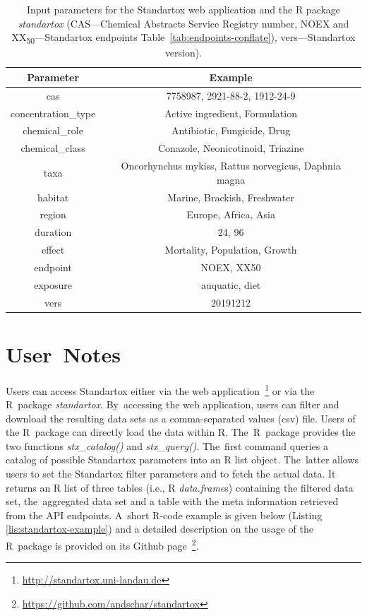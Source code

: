\documentclass[data,datadescriptor,accept,moreauthors,pdftex]{Definitions/mdpi}
\begin{document}
\begin{table}[H]
    \caption{Input parameters for the Standartox web application and the R package \textit{standartox} (CAS---Chemical Abstracts Service Registry number, NOEX and XX\textsubscript{50}---Standartox endpoints Table~\ref{tab:endpoints-conflate}), vers---Standartox version).}
    \label{tab:app-parameters}
    \centering
    \begin{tabular}{cc}
    \toprule
    \textbf{Parameter} & \textbf{Example} \\ 
    \midrule
    cas & 7758987, 2921-88-2, 1912-24-9 \\
    concentration\_type & Active ingredient, Formulation \\
    chemical\_role & Antibiotic, Fungicide, Drug \\
    chemical\_class & Conazole, Neonicotinoid, Triazine \\
    taxa & Oncorhynchus mykiss, Rattus norvegicus, Daphnia magna \\
    habitat & Marine, Brackish, Freshwater \\
    region & Europe, Africa, Asia \\
    duration & 24, 96 \\
    effect & Mortality, Population, Growth \\
    endpoint & NOEX, XX50 \\
    exposure & auquatic, diet \\
    vers & 20191212 \\
    \bottomrule
\end{tabular}
\end{table}
\unskip

\section{User~Notes}
Users can access Standartox either via the web application~\footnote{\url{http://standartox.uni-landau.de}} or via the R~package \textit{standartox}. By~accessing the web application, users can filter and download the resulting data sets as a comma-separated values (csv) file. Users of the R~package can directly load the data within R. The~R~package provides the two functions \textit{stx\_catalog()} and \textit{stx\_query()}. The~first command queries a catalog of possible Standartox parameters into an R list object. The~latter allows users to set the Standartox filter parameters and to fetch the actual data. It returns an R list of three tables (i.e., R \textit{data.frame}s) containing the filtered data set, the~aggregated data set and a table with the meta information retrieved from the API endpoints. A~short R-code example is given below (Listing \ref{lis:standartox-example}) and a detailed description on the usage of the R~package is provided on its Github page~\footnote{\url{https://github.com/andschar/standartox}}.
\end{document}
